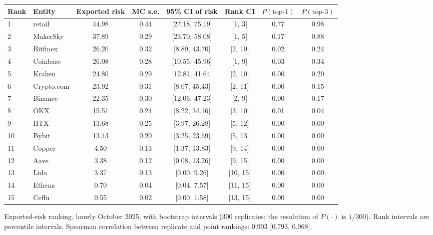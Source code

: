 \documentclass[referee,pdflatex,sn-mathphys-ay]{sn-jnl}
\newcommand{\fitbox}{\ifdim\wd\tabbox>\linewidth\resizebox{\linewidth}{!}{\usebox{\tabbox}}\else\usebox{\tabbox}\fi}%
\theoremstyle{thmstyleone}%
\theoremstyle{thmstyletwo}%
\theoremstyle{thmstylethree}%
\begin{document}
\begin{lrbox}{\tabbox}\footnotesize\setlength{\tabcolsep}{3pt}%
\begin{tabular}{@{}llcccccc@{}}
\toprule
\textbf{Rank} & \textbf{Entity} & \textbf{Exported risk} & \textbf{MC s.e.} & \textbf{95\% CI of risk} & \textbf{Rank CI} & \textbf{$P(\text{top-1})$} & \textbf{$P(\text{top-3})$}\\
\midrule
1 & retail & 44.98 & 0.44 & [27.18, 75.19] & [1, 3] & 0.77 & 0.98 \\
2 & MakerSky & 37.89 & 0.29 & [23.70, 58.08] & [1, 5] & 0.17 & 0.88 \\
3 & Bitfinex & 26.20 & 0.32 & [8.89, 43.70] & [2, 10] & 0.02 & 0.24 \\
4 & Coinbase & 26.08 & 0.28 & [10.55, 45.96] & [1, 9] & 0.03 & 0.34 \\
5 & Kraken & 24.80 & 0.29 & [12.81, 41.64] & [2, 10] & 0.00 & 0.20 \\
6 & Crypto.com & 23.92 & 0.31 & [8.07, 45.43] & [2, 11] & 0.00 & 0.15 \\
7 & Binance & 22.35 & 0.30 & [12.06, 47.23] & [2, 9] & 0.00 & 0.17 \\
8 & OKX & 19.51 & 0.24 & [8.22, 34.16] & [3, 10] & 0.01 & 0.04 \\
9 & HTX & 13.68 & 0.25 & [3.97, 26.28] & [5, 12] & 0.00 & 0.00 \\
10 & Bybit & 13.43 & 0.20 & [3.25, 23.69] & [5, 13] & 0.00 & 0.00 \\
11 & Copper & 4.50 & 0.13 & [1.37, 13.83] & [9, 14] & 0.00 & 0.00 \\
12 & Aave & 3.38 & 0.12 & [0.08, 13.26] & [9, 15] & 0.00 & 0.00 \\
13 & Lido & 3.37 & 0.13 & [0.00, 9.26] & [10, 15] & 0.00 & 0.00 \\
14 & Ethena & 0.70 & 0.04 & [0.04, 7.57] & [11, 15] & 0.00 & 0.00 \\
15 & Ceffu & 0.55 & 0.02 & [0.00, 1.58] & [13, 15] & 0.00 & 0.00 \\
\bottomrule
\end{tabular}
\end{lrbox}
\begin{tableorg}[tbp]
\centering
\caption{Exported-risk ranking, hourly October 2025, with bootstrap intervals (300 replicates; the resolution of
$P(\cdot)$ is $1/300$). Rank intervals are percentile intervals. Spearman correlation between replicate and point
rankings: 0.903 [0.793, 0.968].}
\label{tab:rank}
\fitbox
\end{tableorg}
\end{document}
